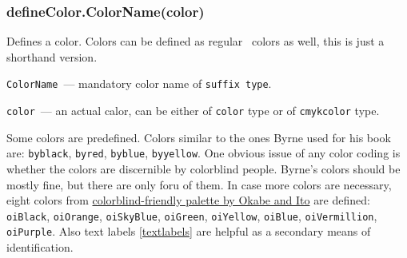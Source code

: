 

\subsubsection{defineColor.ColorName(color)}\label{defineColor}
	
	Defines a color. Colors can be defined as regular \METAPOST\ colors as well, this is just a shorthand version.

	\texttt{ColorName}~— mandatory color name of \texttt{suffix type}.
	
	\texttt{color}~— an actual calor, can be either of \texttt{color} type or of \texttt{cmykcolor} type.
	
	Some colors are predefined. Colors similar to the ones Byrne used for his book are: \texttt{byblack}, \texttt{byred}, \texttt{byblue}, \texttt{byyellow}. One obvious issue of any color coding is whether the colors are discernible by colorblind people. Byrne's colors should be mostly fine, but there are only foru of them. In case more colors are necessary, eight colors from \href{https://jfly.uni-koeln.de/color/}{colorblind-friendly palette by Okabe and Ito} \cite{Okabe2008} are defined: \texttt{oiBlack}, \texttt{oiOrange}, \texttt{oiSkyBlue}, \texttt{oiGreen}, \texttt{oiYellow}, \texttt{oiBlue}, \texttt{oiVermillion}, \texttt{oiPurple}. Also text labels \ref{textlabels} are helpful as a secondary means of identification.

	

	

